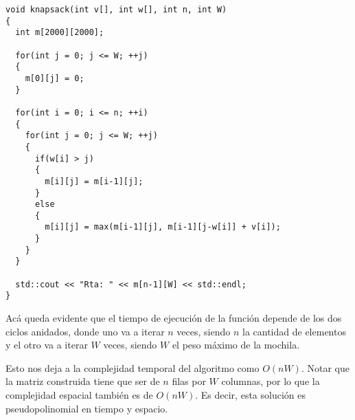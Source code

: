 \begin{center}
\begin{minipage}{1.02\textwidth}
\begin{lstlisting}[frame=lrtb]
void knapsack(int v[], int w[], int n, int W)
{
  int m[2000][2000];
  
  for(int j = 0; j <= W; ++j)
  {
    m[0][j] = 0;
  }

  for(int i = 0; i <= n; ++i)
  {
    for(int j = 0; j <= W; ++j)
    {
      if(w[i] > j)
      {
        m[i][j] = m[i-1][j];
      }
      else
      {
        m[i][j] = max(m[i-1][j], m[i-1][j-w[i]] + v[i]);
      }
    }
  }

  std::cout << "Rta: " << m[n-1][W] << std::endl;
}
\end{lstlisting}
\end{minipage}
\end{center}

Ac\'a queda evidente que el tiempo de ejecuci\'on de la funci\'on depende de los dos ciclos anidados, donde uno va a iterar $n$ veces, siendo $n$ la cantidad de elementos y el otro va a iterar $W$ veces, siendo $W$ el peso m\'aximo de la mochila.

Esto nos deja a la complejidad temporal del algoritmo como $O(nW)$. Notar que la matriz construida tiene que ser de $n$ filas por $W$ columnas, por lo que la complejidad espacial tambi\'en es de $O(nW)$. Es decir, esta soluci\'on es pseudopolinomial en tiempo y espacio.